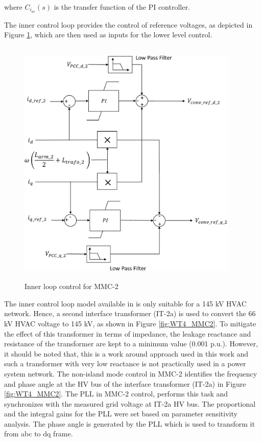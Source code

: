 where $C_{i_{ac}}\left(s\right)$ is the transfer function of the \gls{PI} controller.

The inner control loop provides the control of reference voltages, as depicted in Figure \ref{fig:Inner_control_loop_MMC}, which are then used as inputs for the lower level control.

\begin{figure}[H]
\centering
    \includegraphics[height = 12cm,width = 10.5cm]{Diagrams/Chapter_4/Inner_control_loop_MMC.pdf}
    \caption{Inner loop control for MMC-2 \cite{saad2015modelisation}}
    \label{fig:Inner_control_loop_MMC}
\end{figure}

The inner control loop model available in \cite{vrana2013cigre} is only suitable for a 145 kV \gls{HVAC} network. Hence, a second interface transformer (IT-2a) is used to convert the 66 kV \gls{HVAC} voltage to 145 kV, as shown in Figure \ref{fig:WT4_MMC2}. To mitigate the effect of this transformer in terms of impedance, the leakage reactance and resistance of the transformer are kept to a minimum value (0.001 p.u.). However, it should be noted that, this is a work around approach used in this work and such a transformer with very low reactance is not practically used in a power system network. The non-island mode control in \gls{MMC}-2 identifies the frequency and phase angle at the \gls{HV} bus of the interface transformer (IT-2a) in Figure \ref{fig:WT4_MMC2}. The \gls{PLL} in \gls{MMC}-2 control, performs this task and synchronizes with the measured grid voltage at IT-2a \gls{HV} bus. The proportional and the integral gains for the \gls{PLL} were set based on parameter sensitivity analysis. The phase angle is generated by the \gls{PLL} which is used to transform it from abc to dq frame.


